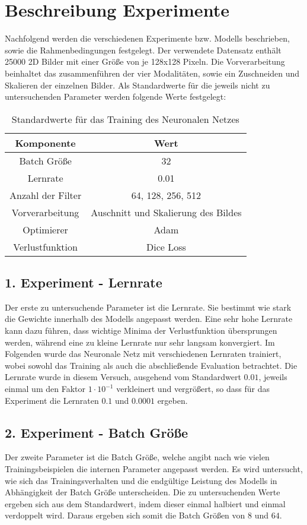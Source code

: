 \section{Beschreibung Experimente}
Nachfolgend werden die verschiedenen Experimente bzw. \glspl{Modell} beschrieben, sowie die Rahmenbedingungen festgelegt. Der verwendete Datensatz enthält 25000 2D Bilder mit einer Größe von je 128x128 Pixeln. Die Vorverarbeitung beinhaltet das zusammenführen der vier Modalitäten, sowie ein Zuschneiden und Skalieren der einzelnen Bilder. Als Standardwerte für die jeweils nicht zu untersuchenden Parameter werden folgende Werte festgelegt:
\begin{table}[h!]
\begin{longtable}{|c|c|}
	\hline
		\multicolumn{1}{|c|}{\textbf{Komponente}} & \multicolumn{1}{c|}{\textbf{Wert}} \\
		\endhead
	\hline
		Batch Größe & 32 \\
	\hline
		Lernrate & 0.01 \\
	\hline
		Anzahl der Filter & 64, 128, 256, 512 \\
	\hline
		Vorverarbeitung & Auschnitt und Skalierung des Bildes \\
	\hline
		Optimierer & Adam \\
	\hline
		Verlustfunktion & Dice Loss \\
	\hline
\end{longtable}
\caption{Standardwerte für das Training des Neuronalen Netzes}
\end{table}

\subsection{1. Experiment - Lernrate}
Der erste zu untersuchende Parameter ist die Lernrate. Sie bestimmt wie stark die Gewichte innerhalb des \gls{Modell}s angepasst werden. Eine sehr hohe Lernrate kann dazu führen, dass wichtige Minima der Verlustfunktion übersprungen werden, während eine zu kleine Lernrate nur sehr langsam konvergiert. Im Folgenden wurde das Neuronale Netz mit verschiedenen Lernraten trainiert, wobei sowohl das Training als auch die abschließende Evaluation betrachtet. Die Lernrate wurde in diesem Versuch, ausgehend vom Standardwert $0.01$, jeweils einmal um den Faktor $1\cdot 10^{-1}$ verkleinert und vergrößert, so dass für das Experiment die Lernraten $0.1$ und $0.0001$ ergeben.

\subsection{2. Experiment - Batch Größe}
Der zweite Parameter ist die Batch Größe, welche angibt nach wie vielen Trainingsbeispielen die internen Parameter angepasst werden. Es wird untersucht, wie sich das Trainingsverhalten und die endgültige Leistung des \gls{Modell}s in Abhängigkeit der Batch Größe unterscheiden. Die zu untersuchenden Werte ergeben sich aus dem Standardwert, indem dieser einmal halbiert und einmal verdoppelt wird. Daraus ergeben sich somit die Batch Größen von $8$ und $64$.

